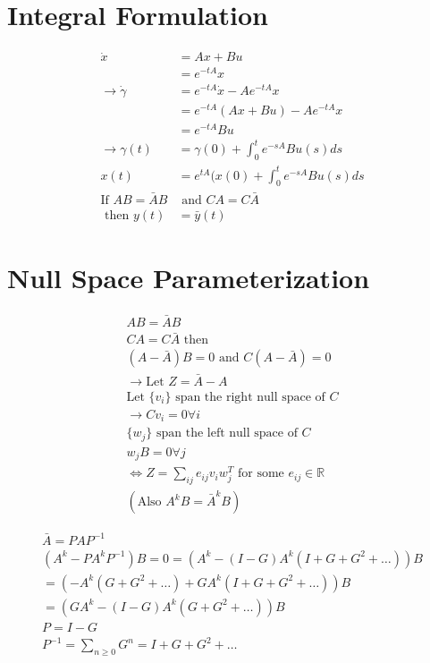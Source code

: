 \documentclass[a4paper, 11 pt]{article}
\begin{document}
  \section{Integral Formulation}
  \begin{equation}
    \begin{split}
      \dot{x} &= Ax + Bu \\
      &= e^{-tA}x \\
      \rightarrow \dot{\gamma} &= e^{-tA} \dot{x} -A e^{-tA}x \\
      &= e^{-tA}(Ax + Bu) - Ae^{-tA}x \\
      &= e^{-tA}Bu \\
      \rightarrow \gamma(t) &= \gamma(0) + \int_{0}^{t} e^{-sA}Bu(s) ds \\
      x(t) &= e^{tA} (x(0) + \int_{0}^{t} e^{-sA}Bu(s) ds \\
      \text{If } AB=\bar{A}B &\text{ and } CA=C\bar{A} \\
      \text{ then } y(t) &= \bar{y}(t)
    \end{split}
  \end{equation}

  \section{Null Space Parameterization}
  \begin{equation}
    \begin{split}
      AB=\bar{A}B \\
      CA = C\bar{A} \text{ then } \\
      (A-\bar{A})B=0 \text{ and } C(A-\bar{A}) = 0 \\
      \rightarrow \text{Let } Z=\bar{A}-A \\
      \text{Let } \{v_{i}\} \text{ span the right null space of } C \\
      \rightarrow Cv_{i} = 0 \forall i \\
      \{w_{j}\} \text{ span the left null space of } C \\
      w_{j}B = 0 \forall j \\
      \iff Z=\sum_{ij} e_{ij}v_{i}w_{j}^{T} \text{ for some } e_{ij} \in \mathbb{R} \\
      (\text{Also } A^{k}B=\bar{A}^kB)
    \end{split}
  \end{equation}

  \begin{equation}
    \begin{split}
      \bar{A} = PAP^{-1} \\
      (A^{k} - PA^{k}P^{-1})B=0=(A^{k}-(I-G)A^{k}(I+G+G^{2}+ \hdots))B \\
      =(-A^{k}(G + G^{2} + \hdots) + GA^{k}(I + G + G^{2} + \hdots))B \\
      = (GA^{k}-(I-G)A^{k}(G+G^{2} + \hdots))B \\
      P=I-G \\
      P^{-1} = \sum_{n \geq 0} G^{n} = I + G + G^{2} + \hdots \\
    \end{split}
  \end{equation}
\end{document}
